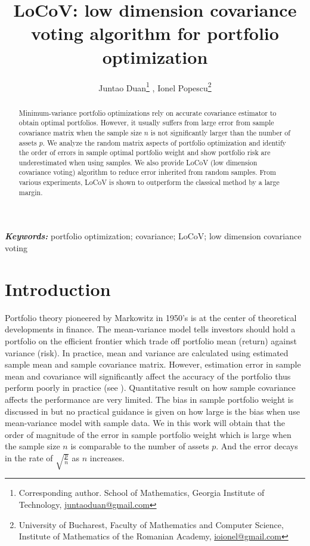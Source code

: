 \documentclass[12pt]{extarticle}
\title{LoCoV: low dimension covariance voting  algorithm for portfolio optimization}
\author{Juntao Duan\footnote{Corresponding author. School of Mathematics, Georgia Institute of Technology, 
    \href{mailto:juntaoduan@gmail.com}{juntaoduan@gmail.com}}
    ,\quad  
    Ionel Popescu\footnote{ University of Bucharest, Faculty of Mathematics and Computer Science, Institute of Mathematics of the Romanian Academy, \href{mailto:ioionel@gmail.com }{ioionel@gmail.com}}
    }
\date{}
\newcommand{\1}{\mathbbm{1}}
\numberwithin{equation}{section}
\providecommand{\keywords}[1]
{
  \small	
  \textbf{\textit{Keywords: }} #1
}
\begin{document}
\maketitle


\begin{abstract}
    Minimum-variance portfolio optimizations rely on accurate covariance estimator to obtain optimal portfolios. However, it usually suffers from large error from sample covariance matrix when the sample size $n$ is not significantly larger than the number of assets $p$. We analyze the random matrix aspects of portfolio optimization and identify the order of errors in sample optimal portfolio weight and show portfolio risk are underestimated when using samples. We also provide LoCoV (low dimension covariance voting) algorithm to reduce error inherited from random samples. From various experiments,  LoCoV is shown to outperform the classical method by a large margin.
\end{abstract}
\keywords{portfolio optimization; covariance; LoCoV; low dimension covariance voting } 



\section{Introduction}
Portfolio theory pioneered by Markowitz in 1950's \cite{markowitz1952portfolio} is at the center of  theoretical developments in finance. The mean-variance model tells investors should hold a portfolio on the efficient frontier which trade off portfolio mean  (return) against variance (risk).  In practice, mean and variance are calculated using estimated sample mean and sample covariance matrix. However, estimation error in sample mean and covariance will significantly affect  the accuracy of the portfolio thus perform poorly in practice (see \cite{jobson1981putting, michaud1989markowitz}). Quantitative result on how sample covariance affects the performance are very limited. The bias in sample portfolio weight is discussed in \cite{el2010high} but no practical guidance is given on how large is the bias when use mean-variance model with sample data. We in this work will obtain that the order of magnitude of the error in sample  portfolio weight which is large when the sample size $n$ is comparable to the number of assets $p$. And the error decays in the rate of $\sqrt{\frac{p}{n}}$ as $n$ increases.
\end{document}
